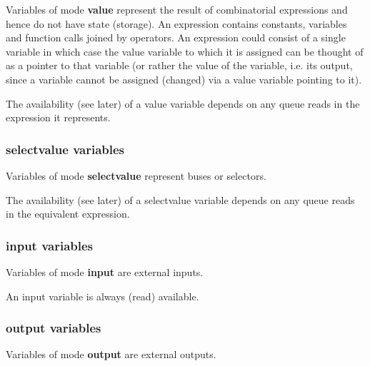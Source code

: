                 Variables of mode {\bf value} represent the result of
                combinatorial expressions and hence do not have state (storage).
                An expression contains constants, variables and function calls
                joined by operators. An expression could consist of a single
                variable in which case the value variable to which it is assigned
                can be thought of as a pointer to that variable (or rather the
                value of the variable, i.e. its output, since a variable cannot
                be assigned (changed) via a value variable pointing to it).

                The availability (see later) of a value variable depends on any
                queue reads in the expression it represents.

            \subsubsection{selectvalue variables}

                Variables of mode {\bf selectvalue} represent buses or selectors.

                The availability (see later) of a selectvalue variable depends
                on any queue reads in the equivalent expression.

            \subsubsection{input variables}

                Variables of mode {\bf input} are external inputs.

                An input variable is always (read) available.

            \subsubsection{output variables}

                Variables of mode {\bf output} are external outputs.

